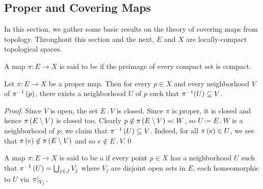 \documentclass[../Moduli_Spaces_of_Riemann_Surfaces.tex]{subfiles}
\begin{document}
    \subsection{Proper and Covering Maps}
    In this section, we gather some basic results on the theory of covering maps from topology. Throughout this section and the next, $E$ and $X$ are locally-compact topological spaces.
    \begin{definition}
        A map $\pi:E\to X$ is said to be  if the preimage of every compact set is compact.
    \end{definition}
    \begin{proposition}\label{1.3:prp:proper_give_neighborhoods}
        Let $\pi:E\to X$ be a proper map. Then for every $p\in X$ and every neighborhood $V$ of $\pi^{-1}\left(p\right)$, there exists a neighborhood $U$ of $p$ such that $\pi^{-1}\!\left(U\right)\subseteq V$.
    \end{proposition}
    \begin{proof}
        Since $V$ is open, the set $E\comp V$ is closed. Since $\pi$ is proper, it is closed and hence $\pi\left(E\setminus V\right)$ is closed too. Clearly $p\not\in\pi\left(E\setminus V\right)\eqqcolon W$, so $U\coloneqq E\comp W$ is a neighborhood of $p$; we claim that $\pi^{-1}\left(U\right)\subseteq V$. Indeed, for all $\pi\left(e\right)\in U$, we see that $\pi\left(e\right)\not\in\pi\left(E\setminus V\right)$ and so $e\not\in E\comp V$.\qed
    \end{proof}
    \begin{definition}
        A map $\pi:E\to X$ is said to be a  if every point $p\in X$ has a neighborhood $U$ such that $\pi^{-1}\left(U\right)=\bigcup_{j\in J}V_j$ where $V_j$ are disjoint open sets in $E$, each homeomorphic to $U$ via $\left.\pi\right|_{V_j}$.
    \end{definition}
\end{document}
